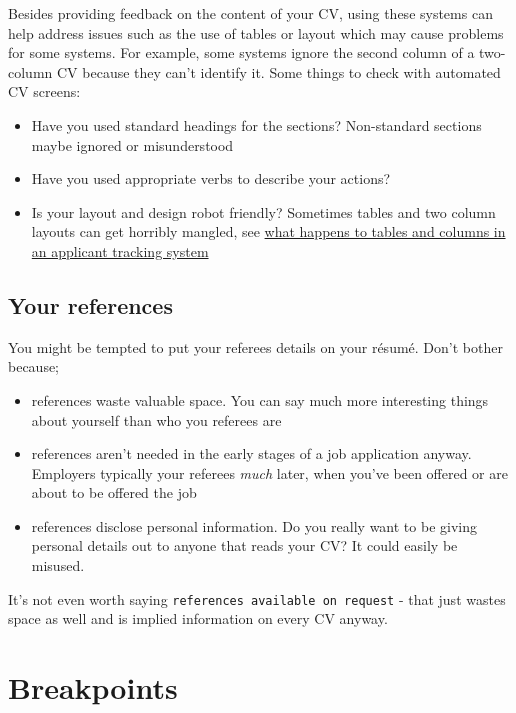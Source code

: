 \documentclass[
]{book}
\providecommand{\tightlist}{%
  \setlength{\itemsep}{0pt}\setlength{\parskip}{0pt}}
\begin{document}
Besides providing feedback on the content of your CV, using these systems can help address issues such as the use of tables or layout which may cause problems for some systems. For example, some systems ignore the second column of a two-column CV because they can't identify it. Some things to check with automated CV screens:

\begin{itemize}
\tightlist
\item
  Have you used standard headings for the sections? Non-standard sections maybe ignored or misunderstood
\item
  Have you used appropriate verbs to describe your actions?
\item
  Is your layout and design robot friendly? Sometimes tables and two column layouts can get horribly mangled, see \href{https://www.jobscan.co/blog/resume-tables-columns-ats/}{what happens to tables and columns in an applicant tracking system} \citep{jobscan}
\end{itemize}

\hypertarget{referees}{%
\subsection{Your references}\label{referees}}

You might be tempted to put your referees details on your résumé. Don't bother because;

\begin{itemize}
\tightlist
\item
  references waste valuable space. You can say much more interesting things about yourself than who you referees are
\item
  references aren't needed in the early stages of a job application anyway. Employers typically your referees \emph{much} later, when you've been offered or are about to be offered the job
\item
  references disclose personal information. Do you really want to be giving personal details out to anyone that reads your CV? It could easily be misused.
\end{itemize}

It's not even worth saying \texttt{references\ available\ on\ request} - that just wastes space as well and is implied information on every CV anyway.

\hypertarget{bp7}{%
\section{Breakpoints}\label{bp7}}
\end{document}
